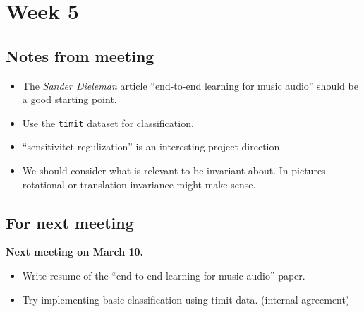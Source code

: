 
\section{Week 5}

\subsection{Notes from meeting}

\begin{itemize}
\item The \textit{Sander Dieleman} article ``end-to-end learning for music
audio'' should be a good starting point.
\item Use the \texttt{timit} dataset for classification.
\item ``sensitivitet regulization'' is an interesting project direction
\item We should consider what is relevant to be invariant about. In pictures
rotational or translation invariance might make sense.
\end{itemize}

\subsection{For next meeting}

\textbf{Next meeting on March 10.}

\begin{itemize}
\item Write resume of the ``end-to-end learning for music audio'' paper.
\item Try implementing basic classification using timit data. (internal
agreement)
\end{itemize}

